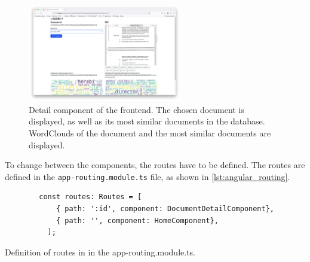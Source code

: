 \begin{figure}[htp] %
    \centering
    \includegraphics[width=0.6\textwidth]{images/UI/Home_detail.png}
    \caption{Detail component of the frontend.
    The chosen document is displayed, as well as its most similar documents in the database.
    WordClouds of the document and the most similar documents are displayed.
    }
    \label{fig:detail_comp}
\end{figure}


To change between the components, the routes have to be defined.
The routes are defined in the \texttt{app-routing.module.ts} file, as shown in \autoref{lst:angular_routing}.

\begin{listing}[htp]
    \begin{verbatim}
        const routes: Routes = [
            { path: ':id', component: DocumentDetailComponent},
            { path: '', component: HomeComponent},
          ];
    \end{verbatim}
    \caption{Definition of routes in \angular{} in the app-routing.module.ts.
    }
    \label{lst:angular_routing}
\end{listing}